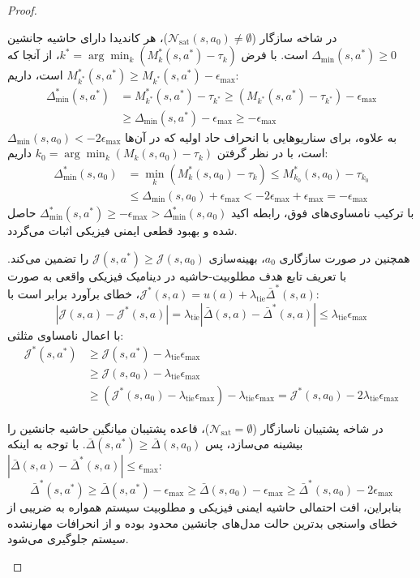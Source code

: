 \documentclass[oneside,openany,phd]{TMU-Thesis}
\begin{document}
\begin{proof}
\begin{enumerate}
    در شاخه سازگار ($\mathcal{N}_{\text{sat}}(s, a_0) \neq \emptyset$)، هر کاندیدا دارای حاشیه جانشین $\Delta_{\min}(s, a^*) \ge 0$ است. با فرض $k^* = \arg\min_k (M^*_k(s, a^*) - \tau_k)$، از آنجا که $M^*_{k^*}(s, a^*) \ge M_{k^*}(s, a^*) - \epsilon_{\max}$ است، داریم:
    \begin{align*}
    \Delta^*_{\min}(s, a^*) &= M^*_{k^*}(s, a^*) - \tau_{k^*} \ge (M_{k^*}(s, a^*) - \tau_{k^*}) - \epsilon_{\max} \\
    &\ge \Delta_{\min}(s, a^*) - \epsilon_{\max} \ge -\epsilon_{\max}
    \end{align*}
    به علاوه، برای سناریوهایی با انحراف حاد اولیه که در آن‌ها $\Delta_{\min}(s, a_0) < -2\epsilon_{\max}$ است، با در نظر گرفتن $k_0 = \arg\min_k (M_k(s, a_0) - \tau_k)$ داریم:
    \begin{align*}
    \Delta^*_{\min}(s, a_0) &= \min_k (M^*_k(s, a_0) - \tau_k) \le M^*_{k_0}(s, a_0) - \tau_{k_0} \\
    &\le \Delta_{\min}(s, a_0) + \epsilon_{\max} < -2\epsilon_{\max} + \epsilon_{\max} = -\epsilon_{\max}
    \end{align*}
    با ترکیب نامساوی‌های فوق، رابطه اکید $\Delta^*_{\min}(s, a^*) \ge -\epsilon_{\max} > \Delta^*_{\min}(s, a_0)$ حاصل شده و بهبود قطعی ایمنی فیزیکی اثبات می‌گردد.
    
    همچنین در صورت سازگاری $a_0$، بهینه‌سازی $\mathcal{J}(s, a^*) \ge \mathcal{J}(s, a_0)$ را تضمین می‌کند. با تعریف تابع هدف مطلوبیت-حاشیه در دینامیک فیزیکی واقعی به صورت $\mathcal{J}^*(s, a) = u(a) + \lambda_{\text{tie}}\bar{\Delta}^*(s, a)$، خطای برآورد برابر است با:
    \[
    |\mathcal{J}(s, a) - \mathcal{J}^*(s, a)| = \lambda_{\text{tie}} |\bar{\Delta}(s, a) - \bar{\Delta}^*(s, a)| \le \lambda_{\text{tie}}\epsilon_{\max}
    \]
    با اعمال نامساوی مثلثی:
    \begin{align*}
    \mathcal{J}^*(s, a^*) &\ge \mathcal{J}(s, a^*) - \lambda_{\text{tie}}\epsilon_{\max} \\
    &\ge \mathcal{J}(s, a_0) - \lambda_{\text{tie}}\epsilon_{\max} \\
    &\ge (\mathcal{J}^*(s, a_0) - \lambda_{\text{tie}}\epsilon_{\max}) - \lambda_{\text{tie}}\epsilon_{\max} = \mathcal{J}^*(s, a_0) - 2\lambda_{\text{tie}}\epsilon_{\max}
    \end{align*}
    
    در شاخه پشتیبان ناسازگار ($\mathcal{N}_{\text{sat}} = \emptyset$)، قاعده پشتیبان میانگین حاشیه جانشین را بیشینه می‌سازد، پس $\bar{\Delta}(s, a^*) \ge \bar{\Delta}(s, a_0)$. با توجه به اینکه $|\bar{\Delta}(s, a) - \bar{\Delta}^*(s, a)| \le \epsilon_{\max}$:
    \[
    \bar{\Delta}^*(s, a^*) \ge \bar{\Delta}(s, a^*) - \epsilon_{\max} \ge \bar{\Delta}(s, a_0) - \epsilon_{\max} \ge \bar{\Delta}^*(s, a_0) - 2\epsilon_{\max}
    \]
    بنابراین، افت احتمالی حاشیه ایمنی فیزیکی و مطلوبیت سیستم همواره به ضریبی از خطای واسنجی بدترین حالت مدل‌های جانشین محدود بوده و از انحرافات مهارنشده سیستم جلوگیری می‌شود.
\end{enumerate}
\end{proof}
\end{document}
